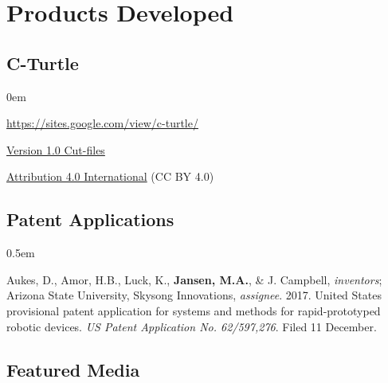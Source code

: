 \documentclass[12pt,a4paper]{article}
\begin{document}
\section*{Products Developed}

	\subsection*{C-Turtle}
		\begin{description}
			\itemsep0em
			\item[Website] \href{https://sites.google.com/view/c-turtle/}{https://sites.google.com/view/c-turtle/}
			\item[Design] \href{https://drive.google.com/file/d/0BxntR7XVPIVqekR3Sjcyd1hkUm8/view}{Version 1.0 Cut-files}
			\item[License] \href{https://creativecommons.org/licenses/by/4.0/}{Attribution 4.0 International} (CC BY 4.0)
		\end{description}

	\subsection*{Patent Applications}

		\begin{description}
			\itemsep0.5em
			\item Aukes, D., Amor, H.B., Luck, K., \textbf{Jansen, M.A.}, \& J. Campbell, \textit{inventors}; Arizona State University, Skysong Innovations, \textit{assignee}. 2017. United States provisional patent application for systems and methods for rapid-prototyped robotic devices. \textit{US Patent Application No. 62/597,276}. Filed 11 December.
		\end{description}

	\subsection*{Featured Media}
\end{document}
